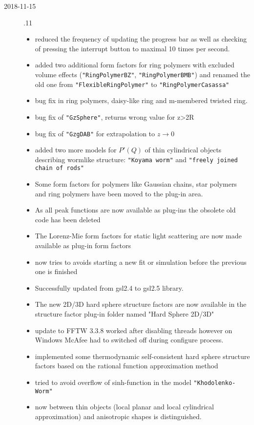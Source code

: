 \begin{description}
\begin{itemize}
    \end{itemize}
\item[2018-11-15] .11
    \begin{itemize}
    \item reduced the frequency of updating the progress bar as well as checking of pressing the interrupt button to maximal 10 times per second.
    \item added two additional form factors for ring polymers with excluded volume effects (\texttt{"RingPolymerBZ"}, \texttt{"RingPolymerBMB"}) and renamed the old one from \texttt{"FlexibleRingPolymer"} to \texttt{"RingPolymerCasassa"}
    \item bug fix in ring polymers, daisy-like ring and m-membered twisted ring.
    \item bug fix of \texttt{"GzSphere"}, returns wrong value for z>2R
    \item bug fix of \texttt{"GzgDAB"} for extrapolation to $z\rightarrow 0$
    \item added two more models for $P'(Q)$ of thin cylindrical objects describing wormlike structure: \texttt{"Koyama worm"} and \texttt{"freely joined chain of rods"}
    \item Some form factors for polymers like Gaussian chains, star polymers and ring polymers have been moved to the plug-in area.
    \item As all peak functions are now available as plug-ins the obsolete old code has been deleted
    \item The Lorenz-Mie form factors for static light scattering are now made available as plug-in form factors
    \item \SASfit now tries to avoids starting a new fit or simulation before the previous one is finished
    \item Successfully updated from gsl2.4 to gsl2.5 library.
    \item The new 2D/3D hard sphere structure factors are now available in the structure factor plug-in folder named "Hard Sphere 2D/3D"
    \item update to FFTW 3.3.8 worked after disabling threads however on Windows McAfee had to switched off during configure process.
    \item implemented some thermodynamic self-consistent hard sphere structure factors based on the rational function approximation method
    \item tried to avoid overflow of sinh-function in the model \texttt{"Khodolenko-Worm"}
    \item now between thin objects (local planar and local cylindrical approximation) and anisotropic shapes is distinguished.

\end{itemize}
\end{description}
